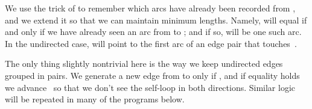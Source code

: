 We use the  trick of  to remember which
arcs have
already been recorded from , and we extend it so that we can maintain
minimum lengths. Namely,  will equal  if and
only
if we have already seen an arc from  to ; and if so, 
will be one such arc. In the undirected case,  will
point to the
first arc of an edge pair that touches~.

The only thing slightly nontrivial here is the way we keep undirected
edges grouped in pairs. We generate a new edge from  to 
only
if , and if equality holds we advance~ so that we
don't
see the self-loop in both directions. Similar logic will be repeated
in many of the programs below.

